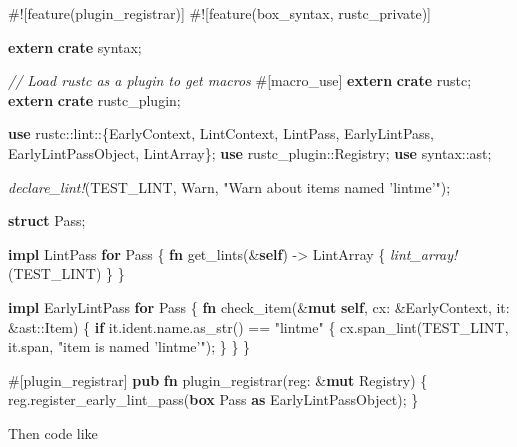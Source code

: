 \documentclass[a4paper,]{book}
\newenvironment{Shaded}{\begin{snugshade}}{\end{snugshade}}
\newcommand{\KeywordTok}[1]{\textcolor[rgb]{0.13,0.29,0.53}{\textbf{{#1}}}}
\newcommand{\StringTok}[1]{\textcolor[rgb]{0.31,0.60,0.02}{{#1}}}
\newcommand{\CommentTok}[1]{\textcolor[rgb]{0.56,0.35,0.01}{\textit{{#1}}}}
\newcommand{\PreprocessorTok}[1]{\textcolor[rgb]{0.56,0.35,0.01}{\textit{{#1}}}}
\newcommand{\AttributeTok}[1]{\textcolor[rgb]{0.77,0.63,0.00}{{#1}}}
\newcommand{\NormalTok}[1]{{#1}}
\begin{document}
\begin{Shaded}
\begin{Highlighting}[]
\AttributeTok{#![}\NormalTok{feature}\AttributeTok{(}\NormalTok{plugin_registrar}\AttributeTok{)]}
\AttributeTok{#![}\NormalTok{feature}\AttributeTok{(}\NormalTok{box_syntax}\AttributeTok{,} \NormalTok{rustc_private}\AttributeTok{)]}

\KeywordTok{extern} \KeywordTok{crate} \NormalTok{syntax;}

\CommentTok{// Load rustc as a plugin to get macros}
\AttributeTok{#[}\NormalTok{macro_use}\AttributeTok{]}
\KeywordTok{extern} \KeywordTok{crate} \NormalTok{rustc;}
\KeywordTok{extern} \KeywordTok{crate} \NormalTok{rustc_plugin;}

\KeywordTok{use} \NormalTok{rustc::lint::\{EarlyContext, LintContext, LintPass, EarlyLintPass,}
                  \NormalTok{EarlyLintPassObject, LintArray\};}
\KeywordTok{use} \NormalTok{rustc_plugin::Registry;}
\KeywordTok{use} \NormalTok{syntax::ast;}

\PreprocessorTok{declare_lint!}\NormalTok{(TEST_LINT, Warn, }\StringTok{"Warn about items named 'lintme'"}\NormalTok{);}

\KeywordTok{struct} \NormalTok{Pass;}

\KeywordTok{impl} \NormalTok{LintPass }\KeywordTok{for} \NormalTok{Pass \{}
    \KeywordTok{fn} \NormalTok{get_lints(&}\KeywordTok{self}\NormalTok{) -> LintArray \{}
        \PreprocessorTok{lint_array!}\NormalTok{(TEST_LINT)}
    \NormalTok{\}}
\NormalTok{\}}

\KeywordTok{impl} \NormalTok{EarlyLintPass }\KeywordTok{for} \NormalTok{Pass \{}
    \KeywordTok{fn} \NormalTok{check_item(&}\KeywordTok{mut} \KeywordTok{self}\NormalTok{, cx: &EarlyContext, it: &ast::Item) \{}
        \KeywordTok{if} \NormalTok{it.ident.name.as_str() == }\StringTok{"lintme"} \NormalTok{\{}
            \NormalTok{cx.span_lint(TEST_LINT, it.span, }\StringTok{"item is named 'lintme'"}\NormalTok{);}
        \NormalTok{\}}
    \NormalTok{\}}
\NormalTok{\}}

\AttributeTok{#[}\NormalTok{plugin_registrar}\AttributeTok{]}
\KeywordTok{pub} \KeywordTok{fn} \NormalTok{plugin_registrar(reg: &}\KeywordTok{mut} \NormalTok{Registry) \{}
    \NormalTok{reg.register_early_lint_pass(}\KeywordTok{box} \NormalTok{Pass }\KeywordTok{as} \NormalTok{EarlyLintPassObject);}
\NormalTok{\}}
\end{Highlighting}
\end{Shaded}

Then code like
\end{document}
